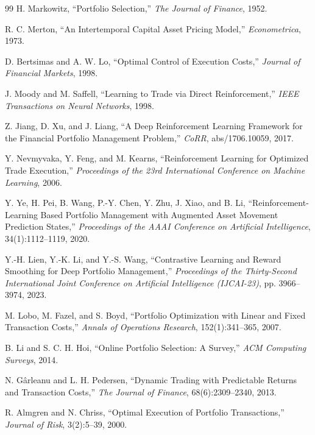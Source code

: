 \documentclass[10pt,twocolumn]{article}
\begin{document}
\begin{thebibliography}{99}
H. Markowitz, ``Portfolio Selection,'' \emph{The Journal of Finance}, 1952.

R. C. Merton, ``An Intertemporal Capital Asset Pricing Model,'' \emph{Econometrica}, 1973.

D. Bertsimas and A. W. Lo, ``Optimal Control of Execution Costs,'' \emph{Journal of Financial Markets}, 1998.

J. Moody and M. Saffell, ``Learning to Trade via Direct Reinforcement,'' \emph{IEEE Transactions on Neural Networks}, 1998.

Z. Jiang, D. Xu, and J. Liang, ``A Deep Reinforcement Learning Framework for the Financial Portfolio Management Problem,'' \emph{CoRR}, abs/1706.10059, 2017.

Y. Nevmyvaka, Y. Feng, and M. Kearns, ``Reinforcement Learning for Optimized Trade Execution,'' \emph{Proceedings of the 23rd International Conference on Machine Learning}, 2006.

Y. Ye, H. Pei, B. Wang, P.-Y. Chen, Y. Zhu, J. Xiao, and B. Li, ``Reinforcement-Learning Based Portfolio Management with Augmented Asset Movement Prediction States,'' \emph{Proceedings of the AAAI Conference on Artificial Intelligence}, 34(1):1112--1119, 2020.

Y.-H. Lien, Y.-K. Li, and Y.-S. Wang, ``Contrastive Learning and Reward Smoothing for Deep Portfolio Management,'' \emph{Proceedings of the Thirty-Second International Joint Conference on Artificial Intelligence (IJCAI-23)}, pp. 3966--3974, 2023.

M. Lobo, M. Fazel, and S. Boyd, ``Portfolio Optimization with Linear and Fixed Transaction Costs,'' \emph{Annals of Operations Research}, 152(1):341--365, 2007.

B. Li and S. C. H. Hoi, ``Online Portfolio Selection: A Survey,'' \emph{ACM Computing Surveys}, 2014.

N. G\^arleanu and L. H. Pedersen, ``Dynamic Trading with Predictable Returns and Transaction Costs,'' \emph{The Journal of Finance}, 68(6):2309--2340, 2013.

R. Almgren and N. Chriss, ``Optimal Execution of Portfolio Transactions,'' \emph{Journal of Risk}, 3(2):5--39, 2000.


\end{thebibliography}
\end{document}
